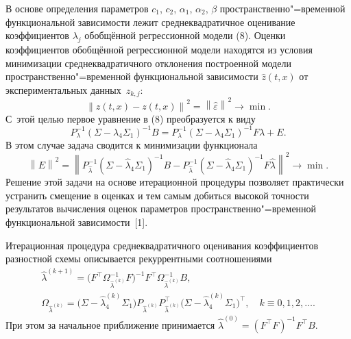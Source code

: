 В основе определения параметров $c_1$, $c_2$, $\alpha_1$, $\alpha_2$, $\beta$ пространственно"=временной функциональной зависимости лежит среднеквадратичное оценивание коэффициентов $\lambda_j$ обобщённой регрессионной модели (8). 
Оценки коэффициентов обобщённой регрессионной модели находятся из условия минимизации среднеквадратичного отклонения построенной модели пространственно"=временной функциональной зависимости $\hat{z}(t,x)$ от экспериментальных данных~$z_{k,j}$: 
$$\left\|\hat{z}(t,x)-z(t,x)\right\|^2=\left\|\hat{\varepsilon}\right\|^2\to\min.$$ 
С~этой целью первое уравнение в (8) преобразуется к виду 
$$P_\lambda^{-1}(\Sigma-\lambda_4\Sigma_1)^{-1}B=P_\lambda^{-1}(\Sigma-\lambda_4\Sigma_1)^{-1}F\lambda+E.$$ 
В этом случае задача сводится к минимизации функционала 
$$\left\|E\right\|^2=\left\|P_{\hat{\lambda}}^{-1}(\Sigma-\hat\lambda_4 \Sigma_1)^{-1}B-P_{\hat{\lambda}}^{-1}(\Sigma-\hat \lambda_4 \Sigma_1)^{-1}F\hat{\lambda}\right\|^2\to \min.$$ 
Решение этой задачи на основе итерационной процедуры позволяет практически устранить смещение в оценках и тем самым добиться высокой точности результатов вычисления оценок параметров пространственно"=временной функциональной зависимости~[1].

Итерационная процедура среднеквадратичного оценивания коэффициентов разностной схемы описывается рекуррентными соотношениями
\begin{gather*}
\hat{\lambda}^{(k+1)}=\bigl(F^\top\Omega_{\hat{\lambda}^{(k)}}^{-1}F\bigr)^{-1}F^\top\Omega_{\hat{\lambda}^{(k)}}^{-1}B, \\ \Omega_{\hat{\lambda}^{(k)}}=\bigl(\Sigma-\hat{\lambda}_4^{(k)}\Sigma_1\bigr)P_{\hat{\lambda}^{(k)}}P_{\hat{\lambda}^{(k)}}^\top \bigl(\Sigma-\hat{\lambda}_4^{(k)}\Sigma_1\bigr)^\top, \quad k\equiv 0, 1, 2,\ldots.
\end{gather*}
При этом за начальное приближение принимается  $\hat{\lambda}^{(0)}=(F^\top F)^{-1}F^\top B$.

